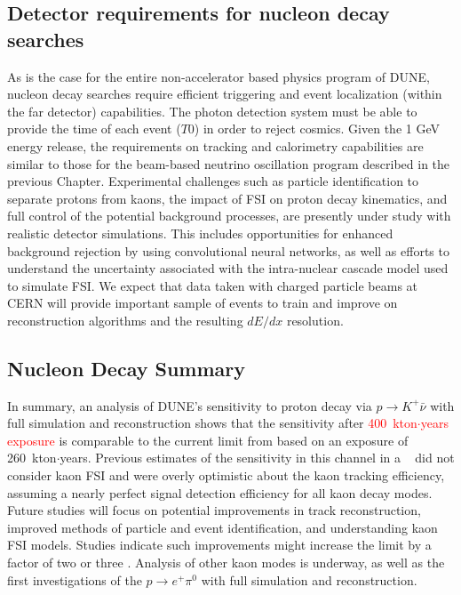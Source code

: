 \subsection{Detector requirements for nucleon decay searches}
\label{subsec:nonaccel-ndk-requirements}

As is the case for the entire non-accelerator based physics program of DUNE, nucleon decay 
searches require efficient triggering and event localization (within the far detector) 
capabilities. The photon detection system must be able to provide the time of each event ($T0$) in order to reject cosmics. Given the 1 GeV energy release, the requirements on tracking and calorimetry 
capabilities are similar to those for the beam-based neutrino oscillation program described 
in the previous Chapter.  
Experimental challenges such as particle identification to separate protons from kaons, 
the impact of FSI on proton decay kinematics, and full control 
of the potential background processes, are presently under study with realistic detector simulations.
This includes opportunities for enhanced background rejection 
by using convolutional neural networks, as well as efforts to understand the 
uncertainty associated with the intra-nuclear cascade model used to simulate FSI. 
We expect that  data taken with charged particle beams at CERN will 
provide important sample of events to train and improve on reconstruction algorithms 
and the resulting $dE/dx$ resolution.

\subsection{Nucleon Decay Summary}
\label{sec:ndksummary}

In summary, an analysis of DUNE's sensitivity to proton decay via $p\rightarrow K^{+} \bar{\nu}$ with full simulation and reconstruction shows that the sensitivity after \textcolor{red}{400~kton$\cdot$years exposure}
is comparable to the current limit from \superk based on an exposure of 260~kton$\cdot$years.  Previous estimates of the sensitivity in this channel in a \lartpc~\cite{Acciarri:2015uup} did not consider kaon FSI and were overly optimistic about the kaon tracking efficiency, assuming a nearly perfect signal detection efficiency for all kaon decay modes.  Future studies will focus on potential improvements in track reconstruction, improved methods of particle and event identification, and understanding kaon FSI models.  Studies indicate such improvements might increase the limit by a factor of two or three .  Analysis of other kaon modes is underway, as well as the first investigations of the $p \rightarrow e^{+}\pi^0$ with full simulation and reconstruction.


